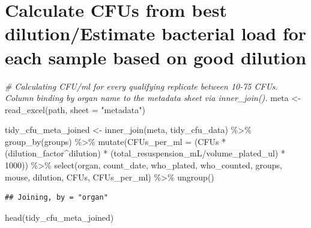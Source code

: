 \documentclass[
]{book}
\newenvironment{Shaded}{\begin{snugshade}}{\end{snugshade}}
\newcommand{\AttributeTok}[1]{\textcolor[rgb]{0.77,0.63,0.00}{#1}}
\newcommand{\CommentTok}[1]{\textcolor[rgb]{0.56,0.35,0.01}{\textit{#1}}}
\newcommand{\DecValTok}[1]{\textcolor[rgb]{0.00,0.00,0.81}{#1}}
\newcommand{\FunctionTok}[1]{\textcolor[rgb]{0.00,0.00,0.00}{#1}}
\newcommand{\NormalTok}[1]{#1}
\newcommand{\OtherTok}[1]{\textcolor[rgb]{0.56,0.35,0.01}{#1}}
\newcommand{\SpecialCharTok}[1]{\textcolor[rgb]{0.00,0.00,0.00}{#1}}
\newcommand{\StringTok}[1]{\textcolor[rgb]{0.31,0.60,0.02}{#1}}
\begin{document}
\hypertarget{calculate-cfus-from-best-dilutionestimate-bacterial-load-for-each-sample-based-on-good-dilution}{%
\section{Calculate CFUs from best dilution/Estimate bacterial load for each sample based on good dilution}\label{calculate-cfus-from-best-dilutionestimate-bacterial-load-for-each-sample-based-on-good-dilution}}

\begin{Shaded}
\begin{Highlighting}[]
\CommentTok{\# Calculating CFU/ml for every qualifying replicate between 10{-}75 CFUs. Column binding by organ name to the metadata sheet via inner\_join().}
\NormalTok{meta }\OtherTok{\textless{}{-}} \FunctionTok{read\_excel}\NormalTok{(path, }\AttributeTok{sheet =} \StringTok{"metadata"}\NormalTok{)}

\NormalTok{tidy\_cfu\_meta\_joined }\OtherTok{\textless{}{-}} \FunctionTok{inner\_join}\NormalTok{(meta, tidy\_cfu\_data) }\SpecialCharTok{\%\textgreater{}\%}
  \FunctionTok{group\_by}\NormalTok{(groups) }\SpecialCharTok{\%\textgreater{}\%} 
  \FunctionTok{mutate}\NormalTok{(}\AttributeTok{CFUs\_per\_ml =}\NormalTok{ (CFUs }\SpecialCharTok{*}\NormalTok{ (dilution\_factor}\SpecialCharTok{\^{}}\NormalTok{dilution) }\SpecialCharTok{*} 
\NormalTok{                          (total\_resuspension\_mL}\SpecialCharTok{/}\NormalTok{volume\_plated\_ul) }\SpecialCharTok{*} \DecValTok{1000}\NormalTok{)) }\SpecialCharTok{\%\textgreater{}\%}
  \FunctionTok{select}\NormalTok{(organ, count\_date, who\_plated, who\_counted, groups,  mouse, dilution,  }
\NormalTok{         CFUs, CFUs\_per\_ml) }\SpecialCharTok{\%\textgreater{}\%} 
  \FunctionTok{ungroup}\NormalTok{()}
\end{Highlighting}
\end{Shaded}

\begin{verbatim}
## Joining, by = "organ"
\end{verbatim}

\begin{Shaded}
\begin{Highlighting}[]
\FunctionTok{head}\NormalTok{(tidy\_cfu\_meta\_joined)}
\end{Highlighting}
\end{Shaded}
\end{document}
